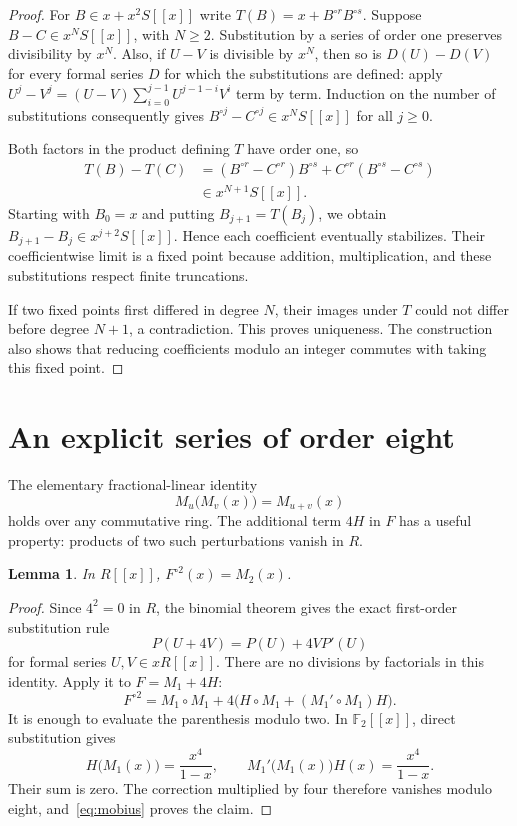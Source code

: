 \documentclass[11pt]{article}
\newtheorem{lemma}[theorem]{Lemma}
\theoremstyle{remark}
\newcommand{\itn}[2]{{#1}^{\circ #2}}
\begin{document}
\begin{proof}
For $B\in x+x^2S[[x]]$ write
$T(B)=x+\itn{B}{r}\itn{B}{s}$. Suppose $B-C\in x^NS[[x]]$, with
$N\geq2$. Substitution by a series of order one preserves divisibility
by $x^N$. Also, if $U-V$ is divisible by $x^N$, then so is
$D(U)-D(V)$ for every formal series $D$ for which the substitutions
are defined: apply $U^j-V^j=(U-V)\sum_{i=0}^{j-1}U^{j-1-i}V^i$
term by term. Induction on the number of substitutions consequently gives
$\itn{B}{j}-\itn{C}{j}\in x^NS[[x]]$ for all $j\geq0$.

Both factors in the product defining $T$ have order one, so
\begin{align*}
T(B)-T(C)
&=(\itn{B}{r}-\itn{C}{r})\itn{B}{s}
  +\itn{C}{r}(\itn{B}{s}-\itn{C}{s})\\
&\in x^{N+1}S[[x]].
\end{align*}
Starting with $B_0=x$ and putting $B_{j+1}=T(B_j)$, we obtain
$B_{j+1}-B_j\in x^{j+2}S[[x]]$. Hence each coefficient eventually
stabilizes. Their coefficientwise limit is a fixed point because addition,
multiplication, and these substitutions respect finite truncations.

If two fixed points first differed in degree $N$, their images under
$T$ could not differ before degree $N+1$, a contradiction. This proves
uniqueness. The construction also shows that reducing coefficients
modulo an integer commutes with taking this fixed point.
\end{proof}

\section{An explicit series of order eight}

The elementary fractional-linear identity
\begin{equation}\label{eq:mobius}
M_u\bigl(M_v(x)\bigr)=M_{u+v}(x)
\end{equation}
holds over any commutative ring. The additional term $4H$ in $F$
has a useful property: products of two such perturbations vanish in $R$.

\begin{lemma}\label{lem:square}
In $R[[x]]$, $\itn{F}{2}(x)=M_2(x)$.
\end{lemma}

\begin{proof}
Since $4^2=0$ in $R$, the binomial theorem gives the exact first-order
substitution rule
\begin{equation}\label{eq:taylor}
P(U+4V)=P(U)+4V P'(U)
\end{equation}
for formal series $U,V\in xR[[x]]$. There are no divisions by
factorials in this identity. Apply it to $F=M_1+4H$:
\[
\itn{F}{2}=M_1\circ M_1+
4\bigl(H\circ M_1+(M_1'\circ M_1)H\bigr).
\]
It is enough to evaluate the parenthesis modulo two. In $\mathbb F_2[[x]]$,
direct substitution gives
\[
H\bigl(M_1(x)\bigr)=\frac{x^4}{1-x},
\qquad
M_1'\bigl(M_1(x)\bigr)H(x)=\frac{x^4}{1-x}.
\]
Their sum is zero. The correction multiplied by four therefore vanishes
modulo eight, and~\eqref{eq:mobius} proves the claim.
\end{proof}
\end{document}
